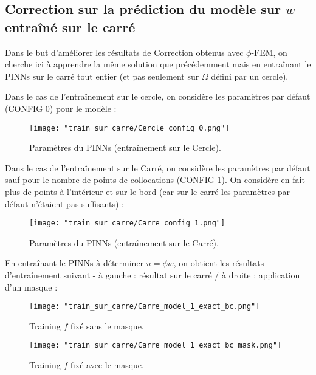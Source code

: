 \subsection{Correction sur la prédiction du modèle sur $w$ entraîné sur le carré}

Dans le but d'améliorer les résultats de Correction obtenus avec $\phi$-FEM, on cherche ici à apprendre la même solution que précédemment mais en entraînant le PINNs sur le carré tout entier (et pas seulement sur $\Omega$ défini par un cercle). 

Dans le cas de l'entraînement sur le cercle, on considère les paramètres par défaut (CONFIG 0) pour le modèle :

\begin{figure}[H]
	\centering
	\texttt{[image: "train\_sur\_carre/Cercle\_config\_0.png"]}
	\caption{Paramètres du PINNs (entraînement sur le Cercle).}
\end{figure}

Dans le cas de l'entraînement sur le Carré, on considère les paramètres par défaut sauf pour le nombre de points de collocations (CONFIG 1). On considère en fait plus de points à l'intérieur et sur le bord (car sur le carré les paramètres par défaut n'étaient pas suffisants) :

\begin{figure}[H]
	\centering
	\texttt{[image: "train\_sur\_carre/Carre\_config\_1.png"]}
	\caption{Paramètres du PINNs (entraînement sur le Carré).}
\end{figure}

En entraînant le PINNs à déterminer $u=\phi w$, on obtient les résultats d'entraînement suivant - à gauche : résultat sur le carré / à droite : application d'un masque :

\vspace{-20pt}
\begin{center}
	\begin{minipage}{0.48\linewidth}
		\begin{figure}[H]
			\centering
			\texttt{[image: "train\_sur\_carre/Carre\_model\_1\_exact\_bc.png"]}
			\caption{Training $f$ fixé sans le masque.}
		\end{figure}
	\end{minipage}
	\begin{minipage}{0.48\linewidth}
		\begin{figure}[H]
			\centering
			\texttt{[image: "train\_sur\_carre/Carre\_model\_1\_exact\_bc\_mask.png"]}
			\caption{Training $f$ fixé avec le masque.}
		\end{figure}
	\end{minipage}
\end{center}

